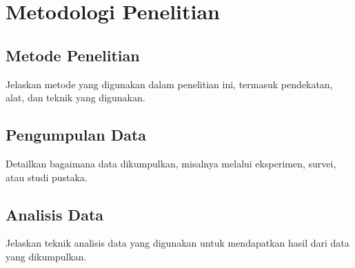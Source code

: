 \chapter{Metodologi Penelitian}
\section{Metode Penelitian}
Jelaskan metode yang digunakan dalam penelitian ini, termasuk pendekatan, alat, dan teknik yang digunakan.

\section{Pengumpulan Data}
Detailkan bagaimana data dikumpulkan, misalnya melalui eksperimen, survei, atau studi pustaka.

\section{Analisis Data}
Jelaskan teknik analisis data yang digunakan untuk mendapatkan hasil dari data yang dikumpulkan.
